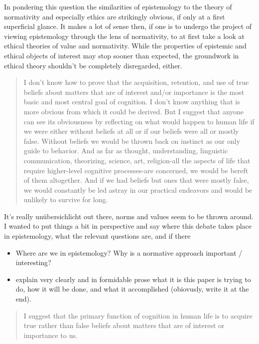 \documentclass[12pt,numbers=noenddot]{scrartcl}
\begin{document}
In pondering this question the similarities of epistemology to the theory of normativity and especially ethics are strikingly obvious, if only at a first superficial glance. It makes a lot of sense then, if one is to undergo the project of viewing epistemology through the lens of normativity, to at first take a look at ethical theories of value and normativity. While the properties of epistemic and ethical objects of interest may stop sooner than expected, the groundwork in ethical theory shouldn't be completely disregarded, either.


\begin{quote}
I don't know how to prove that the acquisition, retention, and use of true beliefs about matters that are of interest and/or importance is the most basic and most central goal of cognition. I don't know anything that is more obvious from which it could be derived. But I suggest that anyone can see its obviousness by reflecting on what would happen to human life if we were either without beliefs at all or if our beliefs were all or mostly false. Without beliefs we would be thrown back on instinct as our only guide to behavior. And as far as thought, understanding, linguistic communication, theorizing, science, art, religion-all the aspects of life that require higher-level cognitive processes-are concerned, we would be bereft of them altogether. And if we had beliefs but ones that were mostly false, we would constantly be led astray in our practical endeavors and would be unlikely to survive for long. \textcite[30]{Alston2005-ALSBJD}
\end{quote}

It's really unübersichlicht out there, norms and values seem to be thrown around. I wanted to put things a bit in perspective and say where this debate takes place in epistemology, what the relevant questions are, and if there 
\begin{itemize}
    \item Where are we in epistemology? Why is a normative approach important / interesting?
    \item explain very clearly and in formidable prose what it is this paper is trying to do, how it will be done, and what it accomplished (obiovusly, write it at the end).
\end{itemize}

\begin{quote}
 I suggest that the primary function of cognition in human life is to acquire true rather than false beliefs about matters that are of interest or importance to us. \textcite[29]{Alston2005-ALSBJD}
\end{quote}
\end{document}
